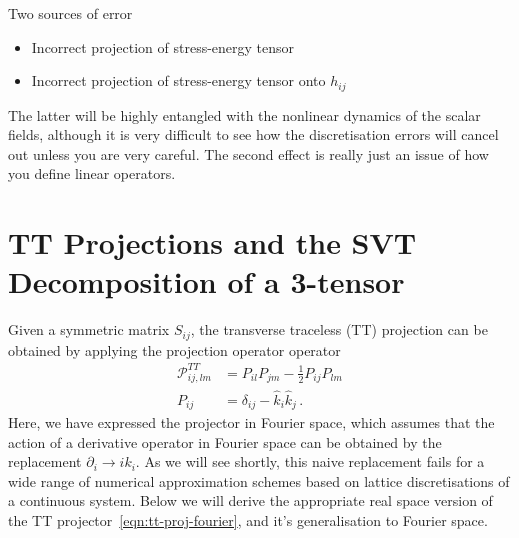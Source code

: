 \documentclass{revtex4}
\newcommand{\proj}{\ensuremath{\mathcal{P}}}
\begin{document}
Two sources of error
\begin{itemize}
\item Incorrect projection of stress-energy tensor
\item Incorrect projection of stress-energy tensor onto $h_{ij}$
\end{itemize}
The latter will be highly entangled with the nonlinear dynamics of the scalar fields, although it is very difficult to see how the discretisation errors will cancel out unless you are very careful.
The second effect is really just an issue of how you define linear operators.

\section{TT Projections and the SVT Decomposition of a 3-tensor}
Given a symmetric matrix $S_{ij}$, the transverse traceless (TT) projection can be obtained by applying the projection operator operator
\begin{align}
  \label{eqn:tt-proj-fourier}
  \proj^{TT}_{ij,lm} &= P_{il}P_{jm} - \frac{1}{2}P_{ij}P_{lm} \\
  P_{ij} &= \delta_{ij} - \hat{k}_i\hat{k}_j \, .
\end{align}
Here, we have expressed the projector in Fourier space, which assumes that the action of a derivative operator in Fourier space can be obtained by the replacement $\partial_i \to ik_i$.
As we will see shortly, this naive replacement fails for a wide range of numerical approximation schemes based on lattice discretisations of a continuous system.
Below we will derive the appropriate real space version of the TT projector~\eqref{eqn:tt-proj-fourier}, and it's generalisation to Fourier space.
\end{document}
